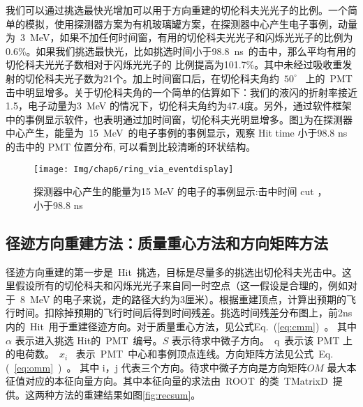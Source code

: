
我们可以通过挑选最快光增加可以用于方向重建的切伦科夫光光子的比例。一个简单的模拟，使用探测器方案为有机玻璃罐方案，在探测器中心产生电子事例，动量为~3~MeV，如果不加任何时间窗，有用的切伦科夫光光子和闪烁光光子的比例为
0.6\%。如果我们挑选最快光，比如挑选时间小于98.8~ns~的击中，那么平均有用的切伦科夫光光子数相对于闪烁光光子的
比例提高为101.7\%。其中未经过吸收重发射的切伦科夫光子数为21个。加上时间窗口后，在切伦科夫角约~$50^{\circ}$~ 上的~PMT~ 击中明显增多。关于切伦科夫角的一个简单的估算如下：我们的液闪的折射率接近1.5，电子动量为3~MeV 的情况下，切伦科夫角约为47.4度。另外，通过软件框架中的事例显示软件，也表明通过加时间窗，切伦科夫光明显增多。图\ref{fig:p61}为在探测器中心产生，能量为~15~MeV~的电子事例的事例显示，观察 Hit time 小于98.8 ns 的击中的 PMT 位置分布, 可以看到比较清晰的环状结构。
\begin{figure}[!htbp]
  \centering
   \texttt{[image: Img/chap6/ring\_via\_eventdisplay]}
    \caption{探测器中心产生的能量为15 MeV 的电子的事例显示:击中时间 cut ，小于98.8 ns }
  \label{fig:p61}
\end{figure}
\subsection{径迹方向重建方法：质量重心方法和方向矩阵方法}
径迹方向重建的第一步是~Hit~挑选，目标是尽量多的挑选出切伦科夫光击中。这里假设所有的切伦科夫和闪烁光光子来自同一时空点（这一假设是合理的，例如对于~8~MeV 的电子来说，走的路径大约为3厘米）。根据重建顶点，计算出预期的飞行时间。扣除掉预期的飞行时间后得到时间残差。挑选时间残差分布图上，前2ns内的~Hit~用于重建径迹方向。对于质量重心方法，见公式Eq.~(\ref{eq:cmm})~。 其中$\alpha$ 表示进入挑选 Hit的~PMT~编号。$S$ 表示待求中微子方向。~q~表示该 PMT 上的电荷数。~$x_i$~ 表示~PMT~中心和事例顶点连线。方向矩阵方法见公式~Eq.(~\ref{eq:omm}~)~。 其中 i，j 代表三个方向。待求中微子方向是方向矩阵$OM$ 最大本征值对应的本征向量方向。其中本征向量的求法由~ROOT~的类~TMatrixD~提供。这两种方法的重建结果如图\ref{fig:recsum}。

